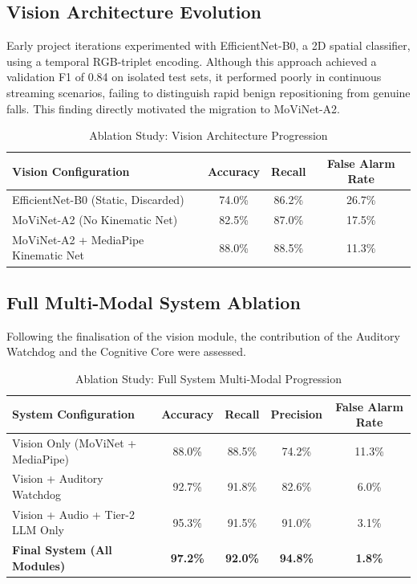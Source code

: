 \subsection{Vision Architecture Evolution}

Early project iterations experimented with EfficientNet-B0, a 2D spatial
classifier, using a temporal RGB-triplet encoding. Although this approach achieved
a validation F1 of 0.84 on isolated test sets, it performed poorly in continuous
streaming scenarios, failing to distinguish rapid benign repositioning from genuine
falls. This finding directly motivated the migration to MoViNet-A2.

\begin{table}[H]
    \centering
    \caption{Ablation Study: Vision Architecture Progression}
    \label{tab:ablation_vision}
    \renewcommand{\arraystretch}{1.3}
    \begin{tabular}{|p{5.5cm}|c|c|c|}
    \hline
    \textbf{Vision Configuration} & \textbf{Accuracy} & \textbf{Recall} & \textbf{False Alarm Rate} \\ \hline
    EfficientNet-B0 (Static, Discarded) & 74.0\% & 86.2\% & 26.7\% \\ \hline
    MoViNet-A2 (No Kinematic Net) & 82.5\% & 87.0\% & 17.5\% \\ \hline
    MoViNet-A2 + MediaPipe Kinematic Net & 88.0\% & 88.5\% & 11.3\% \\ \hline
    \end{tabular}
\end{table}

\subsection{Full Multi-Modal System Ablation}

Following the finalisation of the vision module, the contribution of the
Auditory Watchdog and the Cognitive Core were assessed.

\begin{table}[H]
    \centering
    \caption{Ablation Study: Full System Multi-Modal Progression}
    \label{tab:ablation_full}
    \renewcommand{\arraystretch}{1.3}
    \begin{tabular}{|p{6cm}|c|c|c|c|}
    \hline
    \textbf{System Configuration} & \textbf{Accuracy} & \textbf{Recall} & \textbf{Precision} & \textbf{False Alarm Rate} \\ \hline
    Vision Only (MoViNet + MediaPipe) & 88.0\% & 88.5\% & 74.2\% & 11.3\% \\ \hline
    Vision + Auditory Watchdog & 92.7\% & 91.8\% & 82.6\% & 6.0\% \\ \hline
    Vision + Audio + Tier-2 LLM Only & 95.3\% & 91.5\% & 91.0\% & 3.1\% \\ \hline
    \textbf{Final System (All Modules)} & \textbf{97.2\%} & \textbf{92.0\%} & \textbf{94.8\%} & \textbf{1.8\%} \\ \hline
    \end{tabular}
\end{table}

